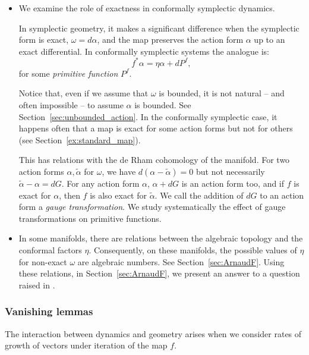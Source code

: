 \documentclass[11pt]{amsart}
\theoremstyle{definition}
\theoremstyle{remark}
\numberwithin{equation}{section}
\begin{document}
 \begin{itemize}
 \item We examine the role of exactness in conformally symplectic dynamics.

   In symplectic geometry, it makes a significant
   difference  when the symplectic form is exact, $\omega = d \alpha$,
   and the map preserves the action form $\alpha$  up to
   an exact differential. In conformally symplectic systems the analogue  is:
   \[
   f^* \alpha = \eta \alpha + dP^f,
   \]
   for some \emph{primitive function} $P^f$.

   \smallskip


    Notice that, even if we assume that $\omega$ is bounded, it is not natural -- and
   often impossible -- to assume $\alpha$ is bounded.  See Section~\ref{sec:unbounded_action}.
   In the conformally symplectic case, it happens often that
   a map is exact for some action forms but not for others (see
   Section~\ref{ex:standard_map}).

   This has relations with the de Rham cohomology of the manifold.
   For two
   action forms $\alpha,\tilde\alpha$ for $\omega$, we have $d(\alpha - \tilde \alpha) = 0$ but
   not necessarily $\tilde \alpha -  \alpha  = dG$.
   For any action form $\alpha$, $\alpha + dG$ is an action form too,
   and if $f$ is exact for $\alpha$, then $f$ is also  exact for $\tilde \alpha$.
   We call the addition of $dG$ to an action form a
   \emph{gauge transformation}.
   We  study systematically the
   effect of gauge transformations  on primitive functions.


 \item
   In some manifolds, there are relations between the algebraic topology
   and the conformal factors $\eta$. Consequently, on these manifolds,
   the possible values of $\eta$  for non-exact $\omega$
   are algebraic numbers.
   See Section~\ref{sec:ArnaudF}.
   Using these relations, in Section~\ref{sec:ArnaudF},
   we present an answer to a question raised in \cite{ArnaudF24}.
 \end{itemize}

\subsubsection{Vanishing lemmas}
The interaction between dynamics and geometry arises when we consider rates of growth of vectors
 under iteration of the map $f$.
\end{document}

